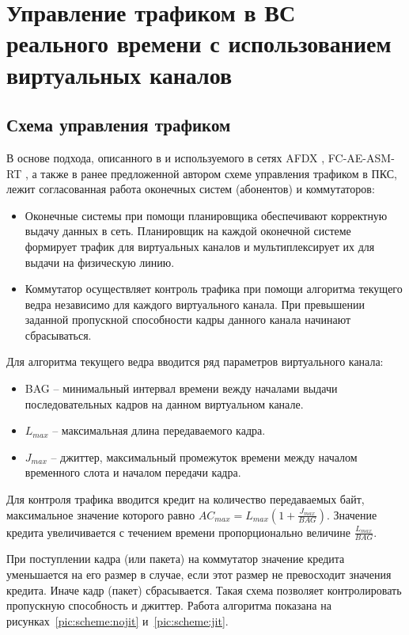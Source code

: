 \documentclass[12pt, a4paper]{article}
\begin{document}
\section{Управление трафиком в ВС реального времени с использованием виртуальных каналов} \label{sec:scheme}
\subsection{Схема управления трафиком}
В основе подхода, описанного в \cite{vdovin} и используемого в сетях AFDX \cite{afdx}, FC-AE-ASM-RT \cite{fcaert}, а также в ранее предложенной автором схеме управления трафиком в ПКС, лежит согласованная работа оконечных систем (абонентов) и коммутаторов:
\begin{itemize}
	\item Оконечные системы при помощи планировщика обеспечивают корректную выдачу данных в сеть. Планировщик на каждой оконечной системе формирует трафик для виртуальных каналов и мультиплексирует их для выдачи на физическую линию.
	\item Коммутатор осуществляет контроль трафика при помощи алгоритма текущего ведра независимо для каждого виртуального канала. При превышении заданной пропускной способности кадры данного канала начинают сбрасываться.
\end{itemize}


Для алгоритма текущего ведра вводится ряд параметров виртуального канала:
\begin{itemize}
	\item BAG -- минимальный интервал времени вежду началами выдачи последовательных кадров на данном виртуальном канале.
	\item $L_{max}$ -- максимальная длина передаваемого кадра.
	\item $J_{max}$ -- джиттер, максимальный промежуток времени между началом временного слота и началом передачи кадра.
\end{itemize}

Для контроля трафика вводится кредит на количество передаваемых байт, максимальное значение которого равно $AC_{max} = L_{max}(1 + \frac{J_{max}}{BAG})$. Значение
кредита увеличивается с течением времени пропорционально величине $\frac{L_{max}}{BAG}$.

При поступлении кадра (или пакета) на коммутатор значение кредита уменьшается на его размер в случае, если этот размер не превосходит значения кредита. Иначе кадр (пакет) сбрасывается. Такая схема позволяет контролировать пропускную способность и джиттер. Работа алгоритма показана на рисунках~\ref{pic:scheme:nojit} и~\ref{pic:scheme:jit}.
\end{document}
